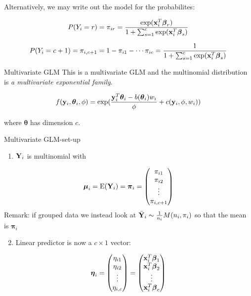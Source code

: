 \documentclass[
  ignorenonframetext,
]{beamer}
\providecommand{\tightlist}{%
  \setlength{\itemsep}{0pt}\setlength{\parskip}{0pt}}
\begin{document}
\begin{frame}
Alternatively, we may write out the model for the probabilites:

\[P(Y_i=r)=\pi_{ir}=\frac{\exp({\bf x}_i^T {\boldsymbol\beta}_r)}{1+\sum_{s=1}^{c}\exp({\bf x}_i^T {\boldsymbol\beta}_s)}\]

\[P(Y_i=c+1)=\pi_{i,c+1}=1-\pi_{i1}-\cdots \pi_{ic}=\frac{1}{1+\sum_{s=1}^{c}\exp({\bf x}_i^T {\boldsymbol\beta}_s)}\]
\end{frame}

\begin{frame}
\begin{block}{Multivariate GLM}
\protect\hypertarget{multivariate-glm}{}
This is a multivariate GLM and the multinomial distribution is \emph{a
multivariate exponential family}.

\[f({\bf y}_i,{\boldsymbol \theta}_i,\phi)=\exp(\frac{{\bf y}_i^T{\boldsymbol \theta}_i-b({\boldsymbol \theta}_i)w_i}{\phi}+c({\bf y}_i,\phi,w_i))\]

where \({\boldsymbol \theta}\) has dimension \(c\).
\end{block}
\end{frame}

\begin{frame}
\begin{block}{Multivariate GLM-set-up}
\protect\hypertarget{multivariate-glm-set-up}{}
\begin{enumerate}
\tightlist
\item
  \({\bf Y}_i\) is multinomial with
\end{enumerate}

\[{\boldsymbol \mu}_i=\text{E}({\bf Y}_i)=
{\boldsymbol \pi}_i=\begin{pmatrix} \pi_{i1}\\ \pi_{i2}\\ \vdots \\ \pi_{i,c+1}\end{pmatrix}\]
Remark: if grouped data we instead look at
\(\bar{\bf Y}_i\sim \frac{1}{n_i}M(n_i,\pi_i)\) so that the mean is
\({\boldsymbol \pi}_i\)
\end{block}
\end{frame}

\begin{frame}
\begin{enumerate}
\setcounter{enumi}{1}
\tightlist
\item
  Linear predictor is now a \(c \times 1\) vector:
\end{enumerate}

\[{\boldsymbol \eta}_i=\begin{pmatrix} \eta_{i1}\\ \eta_{i2}\\ \vdots \\ \eta_{i,c}\end{pmatrix}=
\begin{pmatrix} {\bf x}_i^T{\boldsymbol \beta}_{1}\\ {\bf x}_i^T{\boldsymbol \beta}_{2}\\ \vdots \\ {\bf x}_i^T{\boldsymbol \beta}_{c} \end{pmatrix}\]
\end{frame}
\end{document}
